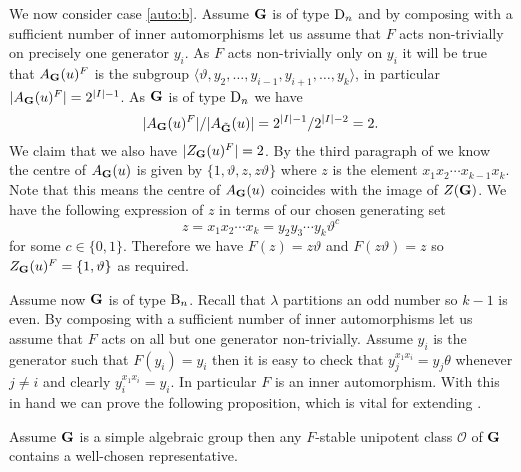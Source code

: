 \documentclass{jt-calcs}
\renewcommand{\cref}{\Cref}
\begin{document}
We now consider case \ref{auto:b}. Assume $\mathbf{G}$ is of type $\operatorname{D}_n$ and by composing with a sufficient number of inner automorphisms let us assume that $F$ acts non-trivially on precisely one generator $y_i$. As $F$ acts non-trivially only on $y_i$ it will be true that $A_{\mathbf{G}}(u)^F$ is the subgroup $\langle \vartheta, y_2,\dots,y_{i-1},y_{i+1},\dots,y_k\rangle$, in particular $|A_{\mathbf{G}}(u)^F| = 2^{|I|-1}$. As $\mathbf{G}$ is of type $\operatorname{D}_n$ we have
\begin{equation}\label{eq:auto-odd-gens-swap}
|A_{\bG}(u)^F|/|A_{\btG}(u)| = 2^{|I|-1}/2^{|I|-2} = 2.
\end{equation}
We claim that we also have $|Z_{\mathbf{G}}(u)^F| = 2$. By the third paragraph of \cite[\S 3.7(a)]{lusztig:2008:irreducible-representations-of-finite-spin-groups} we know the centre of $A_{\mathbf{G}}(u)$ is given by $\{1,\vartheta,z,z\vartheta\}$ where $z$ is the element $x_1x_2\cdots x_{k-1}x_k$. Note that this means the centre of $A_{\mathbf{G}}(u)$ coincides with the image of $Z(\mathbf{G})$. We have the following expression of $z$ in terms of our chosen generating set
\begin{equation*}
z = x_1x_2\cdots x_k = y_2y_3\cdots y_k\vartheta^c
\end{equation*}
for some $c \in \{0,1\}$. Therefore we have $F(z) = z\vartheta$ and $F(z\vartheta) = z$ so $Z_{\mathbf{G}}(u)^F = \{1,\vartheta\}$ as required.

Assume now $\mathbf{G}$ is of type $\operatorname{B}_n$. Recall that $\lambda$ partitions an odd number so $k-1$ is even. By composing with a sufficient number of inner automorphisms let us assume that $F$ acts on all but one generator non-trivially. Assume $y_i$ is the generator such that $F(y_i) = y_i$ then it is easy to check that $y_j^{x_1x_i} = y_j\theta$ whenever $j \neq i$ and clearly $y_i^{x_1x_i} = y_i$. In particular $F$ is an inner automorphism. With this in hand we can prove the following proposition, which is vital for extending \cref{thm:lusztig-hezard}.

\begin{prop}\label{prop:order-comp-grp}
Assume $\mathbf{G}$ is a simple algebraic group then any $F$-stable unipotent class $\mathcal{O}$ of $\mathbf{G}$ contains a well-chosen representative.
\end{prop}
\end{document}
